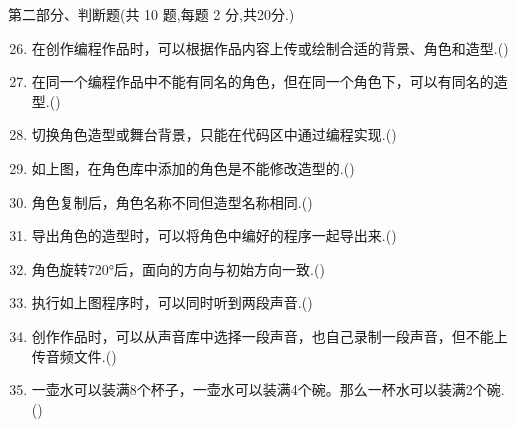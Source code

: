 \documentclass[10pt, a4paper]{article}
\begin{document}
    {\noindent\heiti 第二部分、判断题(共 10 题,每题 2 分,共20分.)}
    \begin{enumerate}
        \setcounter{enumi}{25}
        \item 在创作编程作品时，可以根据作品内容上传或绘制合适的背景、角色和造型.(\qquad)

        \item 在同一个编程作品中不能有同名的角色，但在同一个角色下，可以有同名的造型.(\qquad)
        
        \item 切换角色造型或舞台背景，只能在代码区中通过编程实现.(\qquad)
  
        \item 如上图，在角色库中添加的角色是不能修改造型的.(\qquad)
        
        \item 角色复制后，角色名称不同但造型名称相同.(\qquad)
        
        \item 导出角色的造型时，可以将角色中编好的程序一起导出来.(\qquad)
        
        \item 角色旋转720°后，面向的方向与初始方向一致.(\qquad)
        
        \item 执行如上图程序时，可以同时听到两段声音.(\qquad)
        
        \newpage
        \item 创作作品时，可以从声音库中选择一段声音，也自己录制一段声音，但不能上传音频文件.(\qquad)
        
        \item 一壶水可以装满8个杯子，一壶水可以装满4个碗。那么一杯水可以装满2个碗.(\qquad)
    \end{enumerate}
\end{document}
